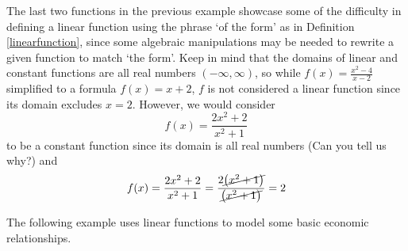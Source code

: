 \medskip


The last two functions in the previous example showcase some of the difficulty in defining a linear function using the phrase `of the form' as in Definition \ref{linearfunction}, since some algebraic manipulations may be needed to rewrite a given function to match `the form'. Keep in mind that the domains of linear and constant functions are all real numbers $(-\infty, \infty)$, so while $f(x) = \frac{x^2-4}{x-2}$ simplified to a formula $f(x) = x+2$, $f$ is not considered a linear function since its domain excludes $x=2$.  However, we would consider \[f(x) = \dfrac{2x^2 + 2}{x^2+1}\] to be a constant function since its domain is all real numbers (Can you tell us why?) and \[ f(x) = \dfrac{2x^2 + 2}{x^2+1} = \dfrac{2\cancel{\left(x^2+1\right)}}{\cancel{\left(x^2+1\right)}} = 2\]

The following example uses linear functions to model some basic economic relationships.

\medskip

